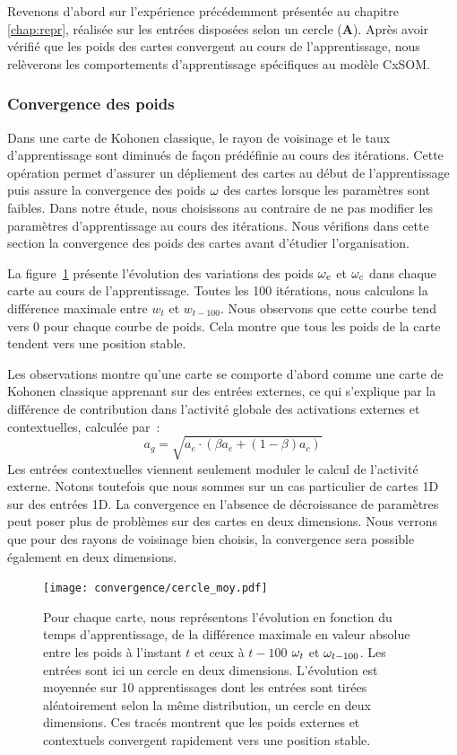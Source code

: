 \documentclass[../main]{subfiles}
\begin{document}
Revenons d'abord sur l'expérience précédemment présentée au chapitre \ref{chap:repr}, réalisée sur les entrées disposées selon un cercle (\textbf{A}).
Après avoir vérifié que les poids des cartes convergent au cours de l'apprentissage, nous relèverons les comportements d'apprentissage spécifiques au modèle CxSOM.

\subsubsection{Convergence des poids}

Dans une carte de Kohonen classique, le rayon de voisinage et le taux d'apprentissage sont diminués de façon prédéfinie au cours des itérations. 
Cette opération permet d'assurer un dépliement des cartes au début de l'apprentissage puis assure la convergence des poids $\omega$ des cartes lorsque les paramètres sont faibles.
Dans notre étude, nous choisissons au contraire de ne pas modifier les paramètres d'apprentissage au cours des itérations.
Nous vérifions dans cette section la convergence des poids des cartes avant d'étudier l'organisation. 

La figure~\ref{fig:conv} présente l'évolution des variations des poids $\omega_{e}$ et $\omega_{c}$ dans chaque carte au cours de l'apprentissage. Toutes les 100 itérations, nous calculons la différence maximale entre $w_t$ et $w_{t-100}$.
Nous observons que cette courbe tend vers $0$ pour chaque courbe de poids. Cela montre que tous les poids de la carte tendent vers une position stable.

Les observations montre qu'une carte se comporte d'abord comme une carte de Kohonen classique apprenant sur des entrées externes, ce qui s'explique par la différence de contribution dans l'activité globale des activations externes et contextuelles, calculée par~: 
$$ a_g = \sqrt{a_e \cdot (\beta a_e + (1-\beta)a_c)}$$
Les entrées contextuelles viennent seulement moduler le calcul de l'activité externe.
Notons toutefois que nous sommes sur un cas particulier de cartes 1D sur des entrées 1D.
La convergence en l'absence de décroissance de paramètres peut poser plus de problèmes sur des cartes en deux dimensions. 
Nous verrons que pour des rayons de voisinage bien choisis, la convergence sera possible également en deux dimensions.

\begin{figure}[h!]
	\texttt{[image: convergence/cercle\_moy.pdf]}
	\caption{Pour chaque carte, nous représentons l'évolution en fonction du temps d'apprentissage, de la différence maximale en valeur absolue entre les poids à l'instant $t$ et ceux à $t-100$ $\omega_t$ et $\omega_{t-100}$. Les entrées sont ici un cercle en deux dimensions. L'évolution est moyennée sur 10 apprentissages dont les entrées sont tirées aléatoirement selon la même distribution, un cercle en deux dimensions.
	Ces tracés montrent que les poids externes et contextuels convergent rapidement vers une position stable.\label{fig:conv}}
\end{figure}
\end{document}
